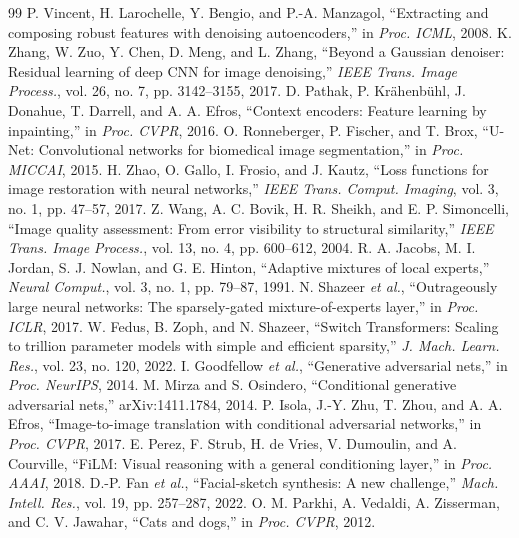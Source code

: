 \documentclass[conference]{IEEEtran}
\begin{document}
\begin{thebibliography}{99}
 P. Vincent, H. Larochelle, Y. Bengio, and P.-A. Manzagol, ``Extracting and composing robust features with denoising autoencoders,'' in \emph{Proc. ICML}, 2008.
 K. Zhang, W. Zuo, Y. Chen, D. Meng, and L. Zhang, ``Beyond a Gaussian denoiser: Residual learning of deep CNN for image denoising,'' \emph{IEEE Trans. Image Process.}, vol. 26, no. 7, pp. 3142--3155, 2017.
 D. Pathak, P. Kr\"ahenb\"uhl, J. Donahue, T. Darrell, and A. A. Efros, ``Context encoders: Feature learning by inpainting,'' in \emph{Proc. CVPR}, 2016.
 O. Ronneberger, P. Fischer, and T. Brox, ``U-Net: Convolutional networks for biomedical image segmentation,'' in \emph{Proc. MICCAI}, 2015.
 H. Zhao, O. Gallo, I. Frosio, and J. Kautz, ``Loss functions for image restoration with neural networks,'' \emph{IEEE Trans. Comput. Imaging}, vol. 3, no. 1, pp. 47--57, 2017.
 Z. Wang, A. C. Bovik, H. R. Sheikh, and E. P. Simoncelli, ``Image quality assessment: From error visibility to structural similarity,'' \emph{IEEE Trans. Image Process.}, vol. 13, no. 4, pp. 600--612, 2004.
 R. A. Jacobs, M. I. Jordan, S. J. Nowlan, and G. E. Hinton, ``Adaptive mixtures of local experts,'' \emph{Neural Comput.}, vol. 3, no. 1, pp. 79--87, 1991.
 N. Shazeer \emph{et al.}, ``Outrageously large neural networks: The sparsely-gated mixture-of-experts layer,'' in \emph{Proc. ICLR}, 2017.
 W. Fedus, B. Zoph, and N. Shazeer, ``Switch Transformers: Scaling to trillion parameter models with simple and efficient sparsity,'' \emph{J. Mach. Learn. Res.}, vol. 23, no. 120, 2022.
 I. Goodfellow \emph{et al.}, ``Generative adversarial nets,'' in \emph{Proc. NeurIPS}, 2014.
 M. Mirza and S. Osindero, ``Conditional generative adversarial nets,'' arXiv:1411.1784, 2014.
 P. Isola, J.-Y. Zhu, T. Zhou, and A. A. Efros, ``Image-to-image translation with conditional adversarial networks,'' in \emph{Proc. CVPR}, 2017.
 E. Perez, F. Strub, H. de Vries, V. Dumoulin, and A. Courville, ``FiLM: Visual reasoning with a general conditioning layer,'' in \emph{Proc. AAAI}, 2018.
 D.-P. Fan \emph{et al.}, ``Facial-sketch synthesis: A new challenge,'' \emph{Mach. Intell. Res.}, vol. 19, pp. 257--287, 2022.
 O. M. Parkhi, A. Vedaldi, A. Zisserman, and C. V. Jawahar, ``Cats and dogs,'' in \emph{Proc. CVPR}, 2012.

\end{thebibliography}
\end{document}
